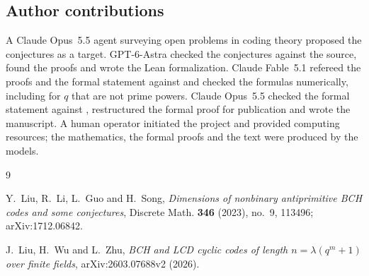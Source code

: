 \documentclass[11pt]{amsart}
\theoremstyle{remark}
\begin{document}
\subsection*{Author contributions}
A Claude Opus~5.5 agent surveying open problems in coding theory proposed the conjectures as a target.
GPT-6-Astra checked the conjectures against the source, found the proofs and wrote the Lean formalization.
Claude Fable~5.1 refereed the proofs and the formal statement against \cite{LWZ} and checked the formulas numerically, including for $q$ that are not prime powers.
Claude Opus~5.5 checked the formal statement against \cite{LWZ}, restructured the formal proof for publication and wrote the manuscript.
A human operator initiated the project and provided computing resources; the mathematics, the formal proofs and the text were produced by the models.

\begin{thebibliography}{9}

Y.~Liu, R.~Li, L.~Guo and H.~Song,
\emph{Dimensions of nonbinary antiprimitive BCH codes and some conjectures},
Discrete Math. \textbf{346} (2023), no.~9, 113496; arXiv:1712.06842.

J.~Liu, H.~Wu and L.~Zhu,
\emph{BCH and LCD cyclic codes of length $n=\lambda(q^m+1)$ over finite fields},
arXiv:2603.07688v2 (2026).

\end{thebibliography}
\end{document}
